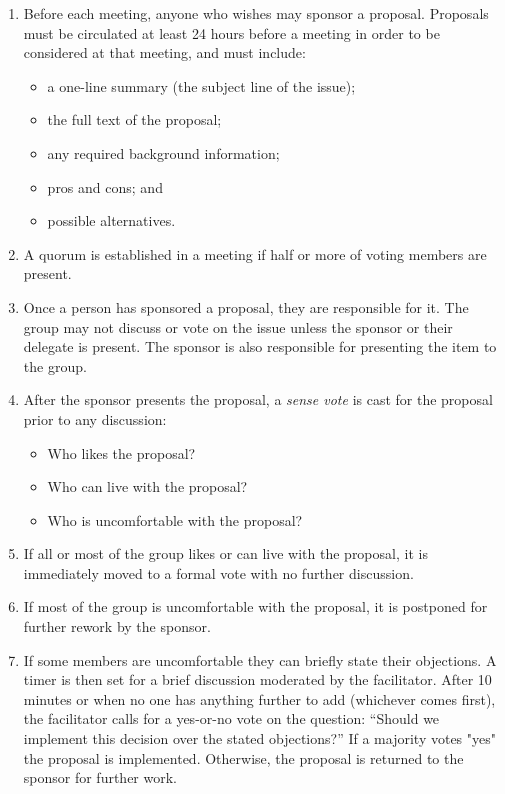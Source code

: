 \documentclass[10pt,letterpaper]{article}
\begin{document}
\begin{enumerate}

\item
  Before each meeting, anyone who wishes may sponsor a proposal.
  Proposals must be circulated at least 24 hours before a meeting
  in order to be considered at that meeting, and must include:

  \begin{itemize}
  \item a one-line summary (the subject line of the issue);
  \item the full text of the proposal;
  \item any required background information;
  \item pros and cons; and
  \item possible alternatives.
  \end{itemize}

\item
  A quorum is established in a meeting if half or more of voting members are
  present.

\item
  Once a person has sponsored a proposal, they are responsible for it.  The
  group may not discuss or vote on the issue unless the sponsor or their
  delegate is present.  The sponsor is also responsible for presenting the item
  to the group.

\item
  After the sponsor presents the proposal, a \emph{sense vote} is cast for the
  proposal prior to any discussion:

  \begin{itemize}
  \item Who likes the proposal?
  \item Who can live with the proposal?
  \item Who is uncomfortable with the proposal?
  \end{itemize}

\item
  If all or most of the group likes or can live with the proposal, it is
  immediately moved to a formal vote with no further discussion.

\item
  If most of the group is uncomfortable with the proposal, it is postponed for
  further rework by the sponsor.

\item
  If some members are uncomfortable they can briefly state their objections.  A
  timer is then set for a brief discussion moderated by the facilitator.  After
  10 minutes or when no one has anything further to add (whichever comes first),
  the facilitator calls for a yes-or-no vote on the question: ``Should we
  implement this decision over the stated objections?''  If a majority votes
  "yes" the proposal is implemented.  Otherwise, the proposal is returned to the
  sponsor for further work.

\end{enumerate}
\end{document}
